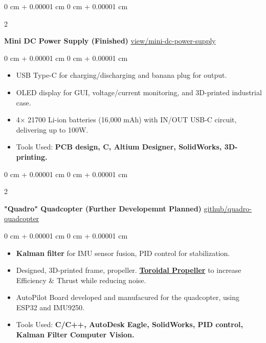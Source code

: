 \documentclass[10pt, letterpaper]{article}
\newenvironment{highlights}{
    \begin{itemize}[
        topsep=0.10 cm,
        parsep=0.10 cm,
        partopsep=0pt,
        itemsep=0pt,
        leftmargin=0 cm + 10pt
    ]
}{
    \end{itemize}
} %
\newenvironment{onecolentry}{
    \begin{adjustwidth}{
        0 cm + 0.00001 cm
    }{
        0 cm + 0.00001 cm
    }
}{
    \end{adjustwidth}
} %
\newenvironment{twocolentry}[2][]{
    \onecolentry
    \def\secondColumn{#2}
    \setcolumnwidth{\fill, 4.5 cm}
    \begin{paracol}{2}
}{
    \switchcolumn \raggedleft \secondColumn
    \end{paracol}
    \endonecolentry
} %
\begin{document}
\vspace{0.4 cm}
\begin{twocolentry}{
      \href{https://sites.google.com/view/kelvincv/projects/mini-dc-power-supply}{view/mini-dc-power-supply}
      }
      \textbf{Mini DC Power Supply (Finished)}\end{twocolentry}

\vspace{0.10 cm}
\begin{onecolentry}
      \begin{highlights}
            \item USB Type-C for charging/discharging and banana plug for output.
            \item OLED display for GUI, voltage/current monitoring, and 3D-printed industrial
            case.
            \item 4× 21700 Li-ion batteries (16,000 mAh) with IN/OUT USB-C circuit, delivering up to 100W.
            \item Tools Used:\textbf{ PCB design, C, Altium Designer, SolidWorks, 3D-printing.}
      \end{highlights}
\end{onecolentry}

\vspace{0.4 cm}
\begin{twocolentry}{
            \href{https://github.com/bocho0600/quadro-quadcopter}{github/quadro-quadcopter}
      }
      \textbf{"Quadro" Quadcopter (Further Developemnt Planned)}\end{twocolentry}

\vspace{0.10 cm}
\begin{onecolentry}
      \begin{highlights}
            \item \textbf{Kalman filter} for IMU sensor fusion, PID control for stabilization.
            \item Designed, 3D-printed frame, propeller.
            \textbf{\href{https://www.ll.mit.edu/sites/default/files/other/doc/2022-09/TVO_Technology_Highlight_41_Toroidal_Propeller.pdf}{Toroidal
                        Propeller}} to increase Efficiency \& Thrust while reducing noise.
            \item AutoPilot Board developed and manufacured for the quadcopter, using ESP32 and
            IMU9250.
            \item Tools Used: \textbf{C/C++, AutoDesk Eagle, SolidWorks, PID control, Kalman
                  Filter Computer Vision.}
      \end{highlights}
\end{onecolentry}
\end{document}
